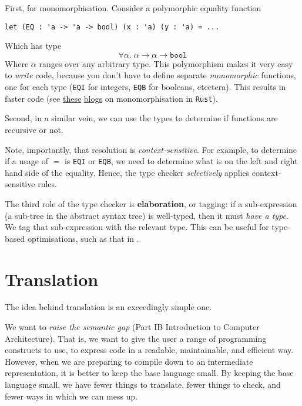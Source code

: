 {First, for monomorphisation. Consider a polymorphic equality function
\begin{verbatim}
let (EQ : 'a -> 'a -> bool) (x : 'a) (y : 'a) = ...
\end{verbatim}
Which has type
\[\forall \alpha. \; \alpha \to \alpha \to \texttt{bool}\]
Where $\alpha$ ranges over any arbitrary type. This polymorphism makes it very easy to \textit{write} code, because you don't have to define separate \textit{monomorphic} functions, one for each type (\texttt{EQI} for integers, \texttt{EQB} for booleans, etcetera). This results in faster code (see \href{https://doc.rust-lang.org/book/ch10-01-syntax.html#performance-of-code-using-generics}{these} \href{https://rustc-dev-guide.rust-lang.org/backend/monomorph.html#monomorphization}{blogs} on monomorphisation in \texttt{Rust}).

Second, in a similar vein, we can use the types to determine if functions are recursive or not.

Note, importantly, that resolution is \textit{context-sensitive}. For example, to determine if a usage of $=$ is \texttt{EQI} or \texttt{EQB}, we need to determine what is on the left and right hand side of the equality. Hence, the type checker \textit{selectively} applies context-sensitive rules.

The third role of the type checker is \textbf{elaboration}, or tagging: if a sub-expression (a sub-tree in the abstract syntax tree) is well-typed, then it must \textit{have a type}. We tag that sub-expression with the relevant type. This can be useful for type-based optimisations, such as that in .

\section{Translation}\label{section:translation-goals}
The idea behind translation is an exceedingly simple one. 

We want to \textit{raise the semantic gap} (\textsf{Part IB Introduction to Computer Architecture}). That is, we want to give the user a range of programming constructs to use, to express code in a readable, maintainable, and efficient way. However, when we are preparing to compile down to an intermediate representation, it is better to keep the base language small. By keeping the base language small, we have fewer things to translate, fewer things to check, and fewer ways in which we can mess up. 

}
